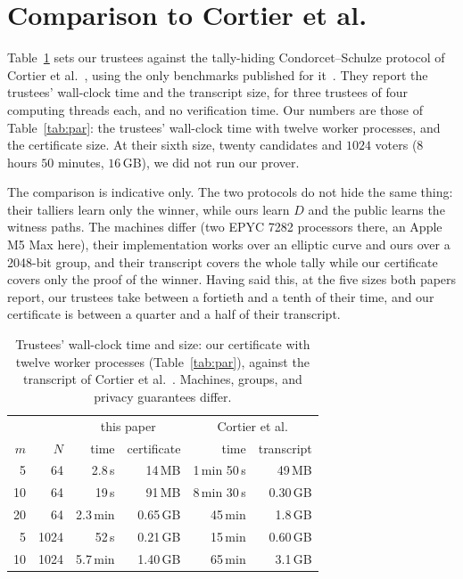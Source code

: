 \section{Comparison to Cortier et al.}\label{app:cortier}
Table~\ref{tab:cortier} sets our trustees against the tally-hiding
Condorcet--Schulze protocol of Cortier et al.~\cite{cgy2022}, using the
only benchmarks published for it~\cite[Table 14]{yang2023thesis}. They
report the trustees' wall-clock time and the transcript size, for three
trustees of four computing threads each, and no verification time. Our
numbers are those of Table~\ref{tab:par}: the trustees' wall-clock time
with twelve worker processes, and the certificate size. At their sixth
size, twenty candidates and $1024$ voters ($8$ hours $50$ minutes,
$16$\,GB), we did not run our prover.

The comparison is indicative only. The two protocols do not hide the
same thing: their talliers learn only the winner, while ours learn $D$
and the public learns the witness paths. The machines differ (two EPYC
7282 processors there, an Apple M5 Max here), their implementation works
over an elliptic curve and ours over a 2048-bit group, and their
transcript covers the whole tally while our certificate covers only the
proof of the winner. Having said this, at the five sizes both papers
report, our trustees take between a fortieth and a tenth of their
time, and our certificate is between a quarter and a half of their
transcript.

\begin{table}[h]
  \caption{Trustees' wall-clock time and size: our certificate with
  twelve worker processes (Table~\ref{tab:par}), against the transcript
  of Cortier et al.~\cite[Table 14]{yang2023thesis}. Machines, groups,
  and privacy guarantees differ.}
  \label{tab:cortier}
  \centering\scriptsize\setlength{\tabcolsep}{3pt}
  \begin{tabular}{@{}rrrrrr@{}}
    \toprule
    & & \multicolumn{2}{c}{this paper} & \multicolumn{2}{c}{Cortier et al.} \\
    $m$ & $N$ & time & certificate & time & transcript \\
    \midrule
    5 & 64 & 2.8\,s & 14\,MB & 1\,min 50\,s & 49\,MB \\
    10 & 64 & 19\,s & 91\,MB & 8\,min 30\,s & 0.30\,GB \\
    20 & 64 & 2.3\,min & 0.65\,GB & 45\,min & 1.8\,GB \\
    5 & 1024 & 52\,s & 0.21\,GB & 15\,min & 0.60\,GB \\
    10 & 1024 & 5.7\,min & 1.40\,GB & 65\,min & 3.1\,GB \\
    \bottomrule
  \end{tabular}
\end{table}
